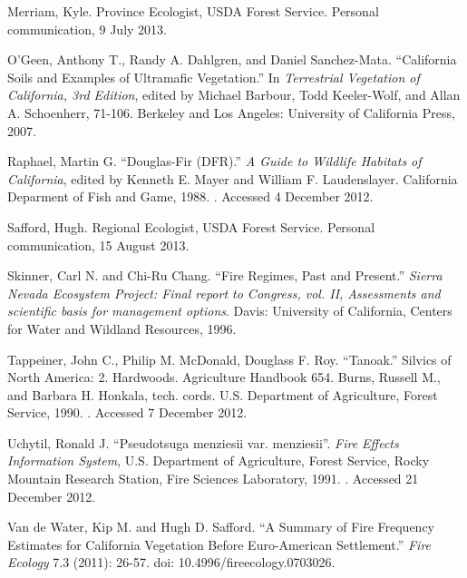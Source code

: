 \begin{hangparas}{.25in}{1}
Merriam, Kyle. Province Ecologist, USDA Forest Service. Personal communication, 9 July 2013.

O’Geen, Anthony T., Randy A. Dahlgren, and Daniel Sanchez-Mata. ``California Soils and Examples of Ultramafic Vegetation.'' In \emph{Terrestrial Vegetation of California, 3rd Edition}, edited by Michael Barbour, Todd Keeler-Wolf, and Allan A. Schoenherr, 71-106. Berkeley and Los Angeles: University of California Press, 2007. 

Raphael, Martin G. ``Douglas-Fir (DFR).'' \emph{A Guide to Wildlife Habitats of California}, edited by Kenneth E. Mayer and William F. Laudenslayer. California Deparment of Fish and Game, 1988. . Accessed 4 December 2012.

Safford, Hugh. Regional Ecologist, USDA Forest Service. Personal communication, 15 August 2013.

Skinner, Carl N. and Chi-Ru Chang. ``Fire Regimes, Past and Present.'' \emph{Sierra Nevada Ecosystem Project: Final report to Congress, vol. II, Assessments and scientific basis for management options}. Davis: University of California, Centers for Water and Wildland Resources, 1996.

Tappeiner, John C., Philip M. McDonald, Douglass F. Roy. ``Tanoak.'' Silvics of North America: 2. Hardwoods. Agriculture Handbook 654. Burns, Russell M., and Barbara H. Honkala, tech. cords. U.S. Department of Agriculture, Forest Service, 1990. . Accessed 7 December 2012.

Uchytil, Ronald J. ``Pseudotsuga menziesii var. menziesii''.  \emph{Fire Effects Information System}, U.S. Department of Agriculture, Forest Service,  Rocky Mountain Research Station, Fire Sciences Laboratory, 1991. . Accessed 21 December 2012.

Van de Water, Kip M. and Hugh D. Safford. ``A Summary of Fire Frequency Estimates for California Vegetation Before Euro-American Settlement.'' \emph{Fire Ecology} 7.3 (2011): 26-57. doi: 10.4996/fireecology.0703026.
\end{hangparas}
